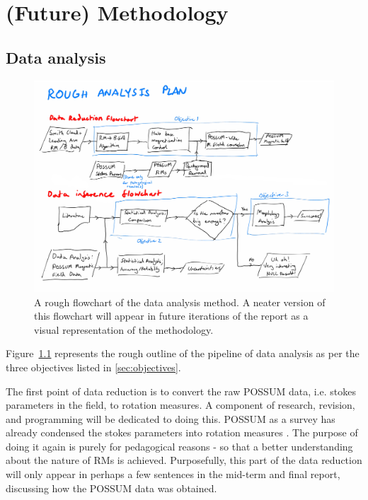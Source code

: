 \chapter{(Future) Methodology}
\label{cha:methodology}

\section{Data analysis}
\label{sec:method}

\begin{figure}[h]
  \label{fig:flowchart}
  \includegraphics[width=\columnwidth]{figs/flowchart.png}
  \caption{A rough flowchart of the data analysis method. A neater version of this flowchart will appear in future iterations of the report as a visual representation of the methodology.}
\end{figure}

Figure~\ref{fig:flowchart} represents the rough outline of the pipeline of data analysis as per the three objectives listed in \ref{sec:objectives}.

The first point of data reduction is to convert the raw POSSUM data, i.e. stokes parameters in the field, to rotation measures. A component of research, revision, and programming will be dedicated to doing this. POSSUM as a survey has already condensed the stokes parameters into rotation measures \cite{ID1}. The purpose of doing it again is purely for pedagogical reasons - so that a better understanding about the nature of RMs is achieved. Purposefully, this part of the data reduction will only appear in perhaps a few sentences in the mid-term and final report, discussing how the POSSUM data was obtained.

